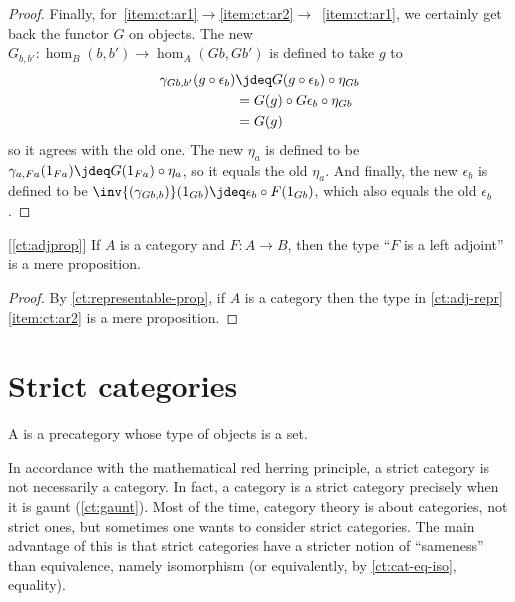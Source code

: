 \begin{proof}
  Finally, for~\ref{item:ct:ar1}$\to$\ref{item:ct:ar2}$\to$~\ref{item:ct:ar1}, we certainly get back the functor $G$ on objects.
  The new $G_{b,b'}:\hom_B(b,b') \to \hom_A(Gb,Gb')$ is defined to take $g$ to
  \begin{align*}
    \gamma_{G b, b'}(g \circ \epsilon_b)
    &\jdeq G(g \circ \epsilon_b) \circ \eta_{Gb}\\
    &= G(g) \circ G\epsilon_b \circ \eta_{Gb}\\
    &= G(g)
  \end{align*}
  so it agrees with the old one.
  The new $\eta_a$ is defined to be $\gamma_{a,Fa}(1_{Fa}) \jdeq G(1_{Fa}) \circ \eta_a$, so it equals the old $\eta_a$.
  And finally, the new $\epsilon_b$ is defined to be $\inv{(\gamma_{Gb,b})}(1_{Gb}) \jdeq \epsilon_b \circ F(1_{Gb})$, which also equals the old $\epsilon_b$.
\end{proof}

\begin{cor}\label{ct:adjprop2}[\cref{ct:adjprop}]
  If $A$ is a category and $F:A\to B$, then the type ``$F$ is a left adjoint'' is a mere proposition.
\end{cor}
\begin{proof}
  By \cref{ct:representable-prop}, if $A$ is a category then the type in \cref{ct:adj-repr}\ref{item:ct:ar2} is a mere proposition.
\end{proof}


\section{Strict categories}
\label{sec:strict-categories}

%

\begin{defn}\label{ct:strict-category}
  A 
  is a precategory whose type of objects is a set.
\end{defn}

In accordance with the mathematical red herring principle, a strict category is not necessarily a category.
In fact, a category is a strict category precisely when it is gaunt (\cref{ct:gaunt}).
%
%
Most of the time, category theory is about categories, not strict ones, but sometimes one wants to consider strict categories.
The main advantage of this is that strict categories have a stricter notion of ``sameness'' than equivalence, namely isomorphism (or equivalently, by \cref{ct:cat-eq-iso}, equality).


